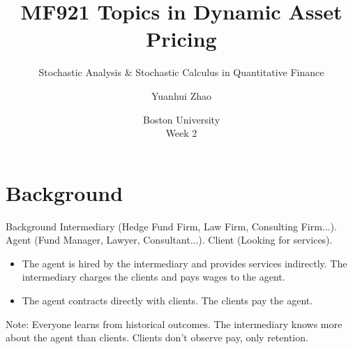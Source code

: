 \documentclass{beamer}
\title{MF921 Topics in Dynamic Asset Pricing}
\subtitle{Stochastic Analysis \& Stochastic Calculus in Quantitative Finance}
\author{Yuanhui Zhao}
\date{Boston University\\Week 2}
\begin{document}
\frame{\titlepage}

\section{Background}
\begin{frame}{Background}
Intermediary (Hedge Fund Firm, Law Firm, Consulting Firm...).  
Agent (Fund Manager, Lawyer, Consultant...).  
Client (Looking for services).

\vspace{2em}
\begin{itemize}
    \item The agent is hired by the intermediary and provides services indirectly. The intermediary charges the clients and pays wages to the agent.
    \vspace{1em}
    \item The agent contracts directly with clients. The clients pay the agent.
\end{itemize}

\vspace{1em}
Note: Everyone learns from historical outcomes. The intermediary knows more about the agent than clients. Clients don’t observe pay, only retention.
\end{frame}

\end{document}
